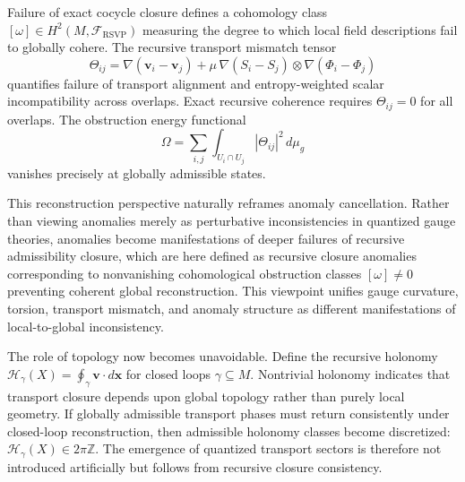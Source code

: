 \documentclass[12pt,a4paper]{article}
\newcommand{\RSVP}{\textrm{RSVP}}
\newcommand{\Sheaf}{\mathcal{F}}
\begin{document}
Failure of exact cocycle closure defines a cohomology class
$[\omega]\in H^2(M,\Sheaf_\RSVP)$ measuring the degree to which local field
descriptions fail to globally cohere. The recursive transport mismatch tensor
\[
\Theta_{ij}
= \nabla(\mathbf{v}_i-\mathbf{v}_j) + \mu\,\nabla(S_i-S_j)\otimes\nabla(\Phi_i-\Phi_j)
\]
quantifies failure of transport alignment and entropy-weighted scalar
incompatibility across overlaps. Exact recursive coherence requires $\Theta_{ij}=0$
for all overlaps. The obstruction energy functional
\[
\Omega = \sum_{i,j}\int_{U_i\cap U_j}|\Theta_{ij}|^2\,d\mu_g
\]
vanishes precisely at globally admissible states.

This reconstruction perspective naturally reframes anomaly cancellation.
Rather than viewing anomalies merely as perturbative inconsistencies in
quantized gauge theories, anomalies become manifestations of deeper failures of
recursive admissibility closure, which are here defined as recursive closure
anomalies corresponding to nonvanishing cohomological obstruction classes
$[\omega]\neq 0$ preventing coherent global reconstruction. This viewpoint
unifies gauge curvature, torsion, transport mismatch, and anomaly structure as
different manifestations of local-to-global inconsistency.

The role of topology now becomes unavoidable. Define the recursive holonomy
$\mathcal{H}_\gamma(X)=\oint_\gamma\mathbf{v}\cdot d\mathbf{x}$ for closed
loops $\gamma\subseteq M$. Nontrivial holonomy indicates that transport closure
depends upon global topology rather than purely local geometry. If globally
admissible transport phases must return consistently under closed-loop
reconstruction, then admissible holonomy classes become discretized:
$\mathcal{H}_\gamma(X)\in 2\pi\mathbb{Z}$. The emergence of quantized transport
sectors is therefore not introduced artificially but follows from recursive
closure consistency.
\end{document}
